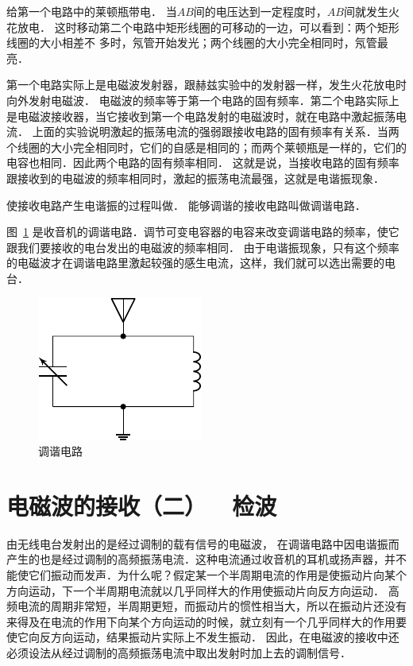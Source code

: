给第一个电路中的莱顿瓶带电．
当$AB$间的电压达到一定程度时，$AB$间就发生火花放电．
这时移动第二个电路中矩形线圈的可移动的一边，可以看到：两个矩形线圈的大小相差不
多时，氖管开始发光；两个线圈的大小完全相同时，氖管最亮．

第一个电路实际上是电磁波发射器，跟赫兹实验中的发射器一样，发生火花放电时向外发射电磁波．
电磁波的频率等于第一个电路的固有频率．第二个电路实际上是电磁波接收器，当它接收到第一个电路发射的电磁波时，就在电路中激起振荡电流．
上面的实验说明激起的振荡电流的强弱跟接收电路的固有频率有关系．当两个线圈的大小完全相同时，它们的自感是相同的；而两个莱顿瓶是一样的，它们的电容也相同．因此两个电路的固有频率相同．
这就是说，当接收电路的固有频率跟接收到的电磁波的频率相同时，激起的振荡电流最强，这就是电谐振现象．

使接收电路产生电谐振的过程叫做．
能够调谐的接收电路叫做调谐电路．


图~\ref{fig_C_4-17} 是收音机的调谐电路．调节可变电容器的电容来改变调谐电路的频率，使它跟我们要接收的电台发出的电磁波的频率相同．
由于电谐振现象，只有这个频率的电磁波才在调谐电路里激起较强的感生电流，这样，我们就可以选出需要的电台．
\begin{figure}[htbp]
	\centering
	\includegraphics{fig/C/4-17.pdf}
	\caption{调谐电路}\label{fig_C_4-17}
\end{figure}



\section{电磁波的接收（二）~~检波}
由无线电台发射出的是经过调制的载有信号的电磁波，
在调谐电路中因电谐振而产生的也是经过调制的高频振荡电流．这种电流通过收音机的耳机或扬声器，并不能使它们振动而发声．为什么呢？假定某一个半周期电流的作用是使振动片向某个方向运动，下一个半周期电流就以几乎同样大的作用使振动片向反方向运动．
高频电流的周期非常短，半周期更短，而振动片的惯性相当大，所以在振动片还没有来得及在电流的作用下向某个方向运动的时候，就立刻有一个几乎同样大的作用要使它向反方向运动，结果振动片实际上不发生振动．
因此，在电磁波的接收中还必须设法从经过调制的高频振荡电流中取出发射时加上去的调制信号．

